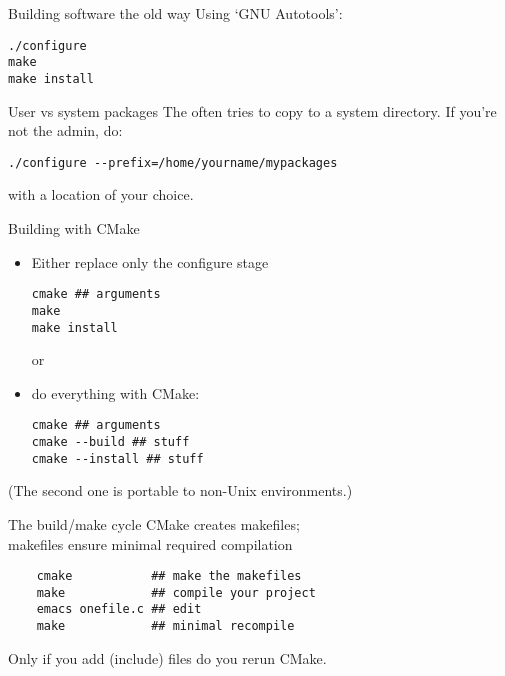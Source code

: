 
\lstset{language=bash}


\begin{numberedframe}{Building software the old way}
  Using `GNU Autotools':
\begin{lstlisting}
./configure
make
make install
\end{lstlisting}
\end{numberedframe}

\begin{numberedframe}{User vs system packages}
  The  often tries to copy
  to a system directory. If you're not the admin, do:
\begin{lstlisting}
./configure --prefix=/home/yourname/mypackages
\end{lstlisting}
with a location of your choice.
\end{numberedframe}

\begin{numberedframe}{Building with CMake}
  \begin{itemize}
  \item Either replace only the configure stage
\begin{lstlisting}
cmake ## arguments
make
make install
\end{lstlisting}
or
  \item do everything with CMake:
\begin{lstlisting}
cmake ## arguments
cmake --build ## stuff
cmake --install ## stuff
\end{lstlisting}
  \end{itemize}
(The second one is portable to non-Unix environments.)
\end{numberedframe}

\begin{numberedframe}{The build/make cycle}
  CMake creates makefiles;\\
  makefiles ensure minimal required compilation
  \begin{lstlisting}
    cmake           ## make the makefiles
    make            ## compile your project
    emacs onefile.c ## edit
    make            ## minimal recompile
  \end{lstlisting}
  Only if you add (include) files do you rerun CMake.
\end{numberedframe}

